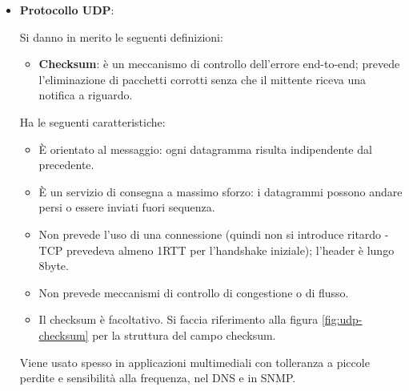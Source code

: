 \documentclass[11pt, italian, openany]{book}
\begin{document}
\begin{sloppypar}
\begin{itemize}[topsep=0pt, itemsep=0pt, parsep=0pt]
\begin{itemize}[topsep=0pt, itemsep=0pt, parsep=0pt]
		Si implementa inoltre lo stato di ``half-close'': uno dei due processi smette di inviare dati mentre ne sta ancora ricevendo; si veda in proposito
		la figura \ref{fig:tcp-half-close}.
		
		Per alcuni esempi, si vedano le figure \ref{fig:chiusura-3way}, \ref{fig:tcp-apertura-chiusura} e \ref{fig:tcp-chiusura}.
	\end{itemize}

	Durante una connessione TCP vengono attraversati pi\`u stati dai dispositivi terminali, tra questi si menziona lo stato \textbf{TIME}:
	indica che il dispositivo si trova adesso in attesa per un periodo di tempo lungo due volte la ``Maximum Segment Lifetime" in modo tale da assicurarsi che
	l'altro endpoint abbia riconosciuto la richiesta di chiusura della connessione; questo stato viene utilizzato per consentire l'eliminazione di segmenti
	duplicati in rete e implementare in maniera affidabile la terminazione della connessione in entrambe le direzioni.

	\item \textbf{Protocollo UDP}:
	Si danno in merito le seguenti definizioni:
	\begin{itemize}[topsep=0pt, itemsep=0pt]
		\item \textbf{Checksum}: \`e un meccanismo di controllo dell'errore end-to-end; prevede l'eliminazione di pacchetti corrotti senza che il mittente riceva
		una notifica a riguardo.
	\end{itemize}
	Ha le seguenti caratteristiche:
	\begin{itemize}[topsep=0pt, itemsep=0pt]
		\item \`E orientato al messaggio: ogni datagramma risulta indipendente dal precedente.
		\item \`E un servizio di consegna a massimo sforzo: i datagrammi possono andare persi o essere inviati fuori sequenza.
		\item Non prevede l'uso di una connessione (quindi non si introduce ritardo - TCP prevedeva almeno 1RTT per l'handshake iniziale); l'header \`e lungo
		8byte.
		\item Non prevede meccanismi di controllo di congestione o di flusso.
		\item Il checksum \`e facoltativo. Si faccia riferimento alla figura \ref{fig:udp-checksum} per la struttura del campo checksum.
	\end{itemize}
	Viene usato spesso in applicazioni multimediali con tolleranza a piccole perdite e sensibilit\`a alla frequenza, nel DNS e in SNMP.


\end{itemize}
\end{sloppypar}
\end{document}
